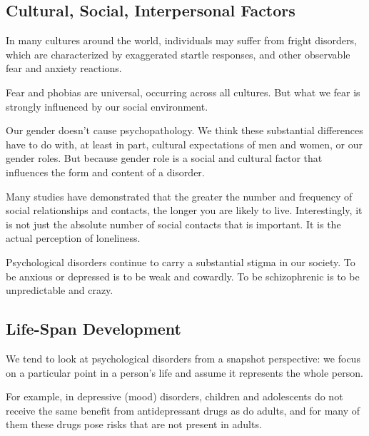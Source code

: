 \subsection{Cultural, Social, Interpersonal Factors}\label{subsec:Cultural_Social_Interpersonal_Factors}
In many cultures around the world, individuals may suffer from fright disorders, which are characterized by exaggerated startle responses, and other observable fear and anxiety reactions.

Fear and phobias are universal, occurring across all cultures.
But what we fear is strongly influenced by our social environment.

Our gender doesn’t cause psychopathology.
We think these substantial differences have to do with, at least in part, cultural expectations of men and women, or our gender roles.
But because gender role is a social and cultural factor that influences the form and content of a disorder.

Many studies have demonstrated that the greater the number and frequency of social relationships and contacts, the longer you are likely to live.
Interestingly, it is not just the absolute number of social contacts that is important.
It is the actual perception of loneliness.

Psychological disorders continue to carry a substantial stigma in our society.
To be anxious or depressed is to be weak and cowardly.
To be schizophrenic is to be unpredictable and crazy.

\subsection{Life-Span Development}\label{subsec:Life-Span_Development}
We tend to look at psychological disorders from a snapshot perspective: we focus on a particular point in a person’s life and assume it represents the whole person.

For example, in depressive (mood) disorders, children and adolescents do not receive the same benefit from antidepressant drugs as do adults, and for many of them these drugs pose risks that are not present in adults.

